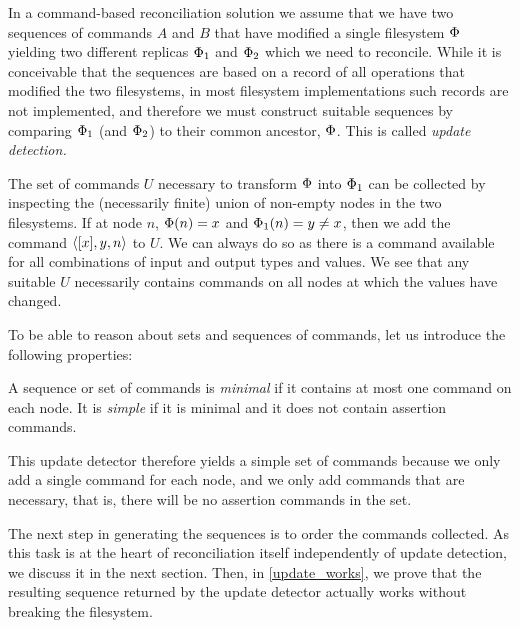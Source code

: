 
In a command-based reconciliation solution we assume that we have two sequences of commands
$A$ and $B$ that have modified a single filesystem $\Phi$ 
yielding two different replicas $\Phi_1$ and $\Phi_2$ which we
need to reconcile. While it is conceivable that the sequences are based on a record of
all operations that modified the two filesystems, in most filesystem implementations
such records are not implemented, and therefore we must construct suitable sequences
by comparing $\Phi_1$ (and $\Phi_2$) to their common ancestor, $\Phi$. 
This is called \emph{update detection.}

The set of commands $U$ necessary to transform $\Phi$ into $\Phi_1$ can be collected
by inspecting the (necessarily finite) union of non-empty nodes in the two filesystems.
If at node $n$, $\Phi(n)=x$ and $\Phi_1(n)=y\neq x$, then we add the command $\langle{[x],y,n}\rangle$ to $U$.
We can always do so as there is a command available for all combinations of input and output types and values.
We see that any suitable $U$ necessarily contains commands on all nodes at which the values have changed.


To be able to reason about sets and sequences of commands, let us introduce the following properties:

\begin{mydef}
A sequence or set of commands is \emph{minimal} if it contains at most one command on each node.
It is \emph{simple} if it is minimal and it does not contain assertion commands.
\end{mydef}

This update detector therefore yields a simple set of commands because we only add a single command
for each node, and we only add commands that are necessary, that is, there will be no 
assertion commands in the set.

The next step in generating the sequences is to order the commands collected.
As this task is at the heart of reconciliation itself independently of update detection,
we discuss it in the next section.
Then, in \cref{update_works}, we prove that the resulting sequence 
returned by the update detector actually works without breaking the filesystem.
